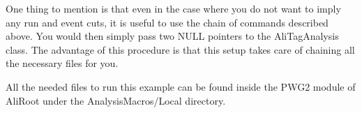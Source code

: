 One thing to mention is that even in the case where you do not want to imply any run and event cuts, it is useful to use the chain of commands described above. You would then simply pass two {\ttfamily NULL} pointers to the {\ttfamily AliTagAnalysis} class. The advantage of this procedure is that this setup takes care of chaining all the necessary files for you.

All the needed files to run this example can be found inside the PWG2 module of AliRoot under the AnalysisMacros/Local directory.


